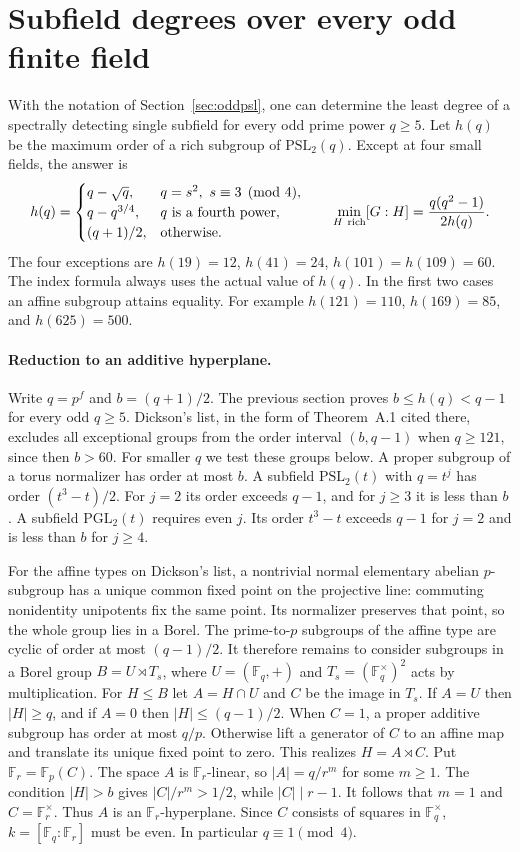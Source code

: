 \section{Subfield degrees over every odd finite field}
\label{sec:oddpowers}
With the notation of Section~\ref{sec:oddpsl}, one can determine the least degree of a spectrally detecting single subfield for every odd prime power $q\ge5$. Let $h(q)$ be the maximum order of a rich subgroup of $\mathrm{PSL}_2(q)$. Except at four small fields, the answer is
\[
 h(q)=
 \begin{cases}
 q-\sqrt q,&q=s^2,\ s\equiv3\pmod4,\\
 q-q^{3/4},&q\text{ is a fourth power},\\
 (q+1)/2,&\text{otherwise}.
 \end{cases}
 \qquad
 \min_{H\ {\rm rich}} [G:H]=\frac{q(q^2-1)}{2h(q)} .
\]
The four exceptions are $h(19)=12$, $h(41)=24$, $h(101)=h(109)=60$. The index formula always uses the actual value of $h(q)$. In the first two cases an affine subgroup attains equality. For example $h(121)=110$, $h(169)=85$, and $h(625)=500$.

\paragraph{Reduction to an additive hyperplane.}
Write $q=p^f$ and $b=(q+1)/2$. The previous section proves $b\le h(q)<q-1$ for every odd $q\ge5$. Dickson's list, in the form of Theorem~A.1 cited there, excludes all exceptional groups from the order interval $(b,q-1)$ when $q\ge121$, since then $b>60$. For smaller $q$ we test these groups below. A proper subgroup of a torus normalizer has order at most $b$. A subfield $\mathrm{PSL}_2(t)$ with $q=t^j$ has order $(t^3-t)/2$. For $j=2$ its order exceeds $q-1$, and for $j\ge3$ it is less than $b$. A subfield $\mathrm{PGL}_2(t)$ requires even $j$. Its order $t^3-t$ exceeds $q-1$ for $j=2$ and is less than $b$ for $j\ge4$.

For the affine types on Dickson's list, a nontrivial normal elementary abelian $p$-subgroup has a unique common fixed point on the projective line: commuting nonidentity unipotents fix the same point. Its normalizer preserves that point, so the whole group lies in a Borel. The prime-to-$p$ subgroups of the affine type are cyclic of order at most $(q-1)/2$. It therefore remains to consider subgroups in a Borel group $B=U\rtimes T_s$, where $U=(\mathbb F_q,+)$ and $T_s=(\mathbb F_q^\times)^2$ acts by multiplication. For $H\le B$ let $A=H\cap U$ and $C$ be the image in $T_s$. If $A=U$ then $|H|\ge q$, and if $A=0$ then $|H|\le(q-1)/2$. When $C=1$, a proper additive subgroup has order at most $q/p$. Otherwise lift a generator of $C$ to an affine map and translate its unique fixed point to zero. This realizes $H=A\rtimes C$. Put $\mathbb F_r=\mathbb F_p(C)$. The space $A$ is $\mathbb F_r$-linear, so $|A|=q/r^m$ for some $m\ge1$. The condition $|H|>b$ gives $|C|/r^m>1/2$, while $|C|\mid r-1$. It follows that $m=1$ and $C=\mathbb F_r^\times$. Thus $A$ is an $\mathbb F_r$-hyperplane. Since $C$ consists of squares in $\mathbb F_q^\times$, $k=[\mathbb F_q:\mathbb F_r]$ must be even. In particular $q\equiv1\pmod4$.

